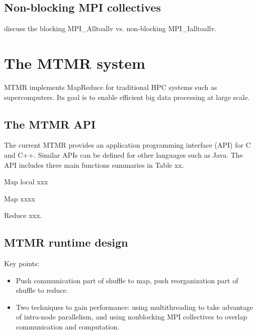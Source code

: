 \documentclass[10pt,conference,compsocconf]{IEEEtran}
\begin{document}
\subsection{Non-blocking MPI collectives}
discuss the blocking MPI\_Alltoallv vs. non-blocking MPI\_Ialltoallv.


\section{The MTMR system}
MTMR implements MapReduce for traditional HPC systems such as 
supercomputers. Its goal is to enable efficient big data processing
at large scale.

\subsection{The MTMR API}
The current MTMR provides an application programming interface (API)
for C and C++. Similar APIs can be defined for other languages such as
Java. The API includes three main functions summaries in Table xx.

Map local xxx

Map xxxx

Reduce xxx.


\subsection{MTMR runtime design}
Key points:

\begin{itemize}
\item Push communication part of shuffle to map, push reorganization part of
shuffle to reduce.
\item Two techniques to gain performance: using multithreading to take advantage
of intra-node parallelism, and using nonblocking MPI collectives to overlap
communication and computation.
\end{itemize}
\end{document}
